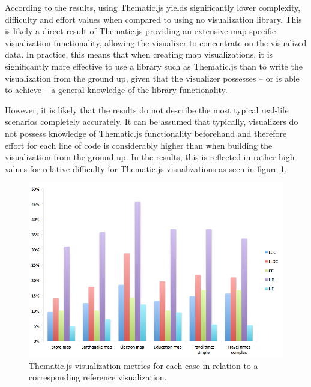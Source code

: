 According to the results, using Thematic.js yields significantly lower complexity, difficulty and effort values when compared to using no visualization library. This is likely a direct result of Thematic.js providing an extensive map-specific visualization functionality, allowing the visualizer to concentrate on the visualized data. In practice, this means that when creating map visualizations, it is significantly more effective to use a library such as Thematic.js than to write the visualization from the ground up, given that the visualizer possesses -- or is able to achieve -- a general knowledge of the library functionality.

However, it is likely that the results do not describe the most typical real-life scenarios completely accurately. It can be assumed that typically, visualizers do not possess knowledge of Thematic.js functionality beforehand and therefore effort for each line of code is considerably higher than when building the visualization from the ground up. In the results, this is reflected in rather high values for relative difficulty for Thematic.js visualizations as seen in figure \ref{fig:evaluationchart}.


\begin{figure}[htbp]
  \begin{center}
    \includegraphics[width=\textwidth]{images/evaluation-results.png}
    \caption{Thematic.js visualization metrics for each case in relation to a corresponding reference visualization.  }
    \label{fig:evaluationchart}
  \end{center}
\end{figure}

